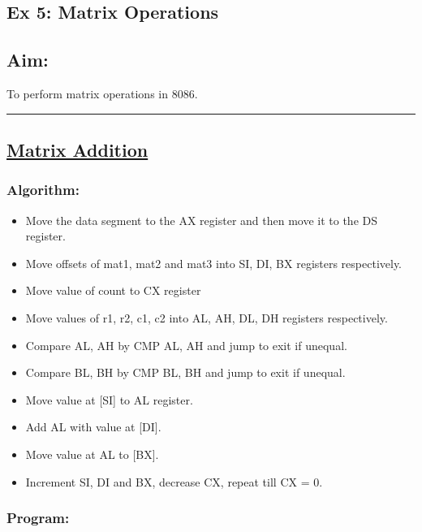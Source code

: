 \documentclass[10pt,a4paper]{article}
\begin{document}
\begin{flushleft}
\section*{\textbf{Ex 5: Matrix Operations}}
\subsection*{\textbf{Aim:}} 
To perform matrix operations in 8086.

\vspace{1cm}
\hrule
\subsection*{\textbf{\underline{Matrix Addition}}}

\subsubsection*{\textbf{Algorithm:}}
\begin{itemize}
    \item Move the data segment to the AX register and then move it to the DS register.
    \item Move offsets of mat1, mat2 and mat3 into SI, DI, BX registers respectively.
    \item Move value of count to CX register
    \item Move values of r1, r2, c1, c2 into AL, AH, DL, DH registers respectively. 
    \item Compare AL, AH by CMP AL, AH and jump to exit if unequal.
    \item Compare BL, BH by CMP BL, BH and jump to exit if unequal.
    \item Move value at [SI] to AL register.
    \item Add AL with value at [DI].
    \item Move value at AL to [BX].
    \item Increment SI, DI and BX, decrease CX, repeat till CX = 0.
\end{itemize}

\newpage
\subsubsection*{\textbf{Program:}}


\end{flushleft}
\end{document}
